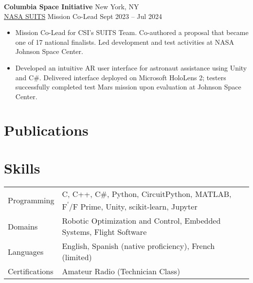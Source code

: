 \documentclass[a4paper,12pt]{article}
\newenvironment{joblong}[4]
    {
    \noindent\textbf{#1} \dotfill #2 \\
    \noindent #3 \dotfill #4 \\[3.75pt]
    \begin{minipage}[t]{\linewidth}
    \begin{itemize}[nosep,after=\strut, leftmargin=1em, itemsep=3pt,label=--]
    }
    {
    \end{itemize}
    \end{minipage}    
    }
\begin{document}
\begin{joblong}{Columbia Space Initiative}{New York, NY}{\href{https://www.nasa.gov/learning-resources/spacesuit-user-interface-technologies-for-students/}{NASA SUITS} Mission Co-Lead}{Sept 2023 -- Jul 2024}
\item Mission Co-Lead for CSI's SUITS Team. Co-authored a proposal that became one of 17 national finalists. Led development and test activities at NASA Johnson Space Center.
\item Developed an intuitive AR user interface for astronaut assistance using Unity and C\#. Delivered interface deployed on Microsoft HoloLens 2; testers successfully completed test Mars mission upon evaluation at Johnson Space Center.
\end{joblong}

\section{Publications}
\begin{refsection}
\nocite{*}
\printbibliography[heading=none]
\end{refsection}

\section{Skills}
\begin{tabularx}{\linewidth}{@{}l X@{}}
Programming & \normalsize{C, C++, C\#, Python, CircuitPython, MATLAB, F\textsuperscript{\'{}}/F Prime, Unity, scikit-learn, Jupyter}\\
Domains & \normalsize{Robotic Optimization and Control, Embedded Systems, Flight Software}\\
Languages & \normalsize{English, Spanish (native proficiency), French (limited)}\\
Certifications & \normalsize{Amateur Radio (Technician Class)}\\
\end{tabularx}

\vfill
{}
\end{document}
